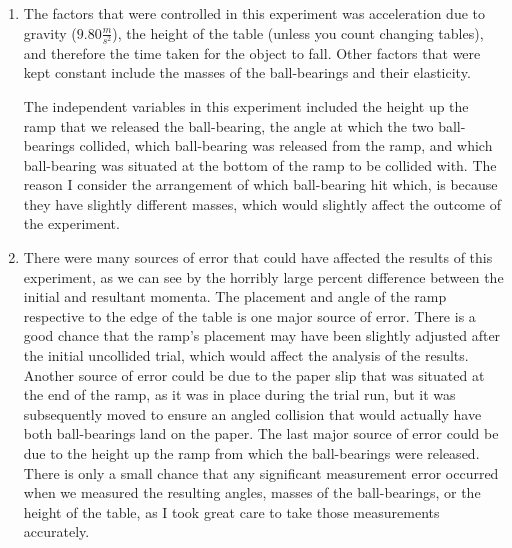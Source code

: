\documentclass[12pt]{article}
\begin{document}
\begin{enumerate}
\item{
The factors that were controlled in this experiment was acceleration due to gravity ($9.80\frac{m}{s^2}$), the height of the table (unless you count changing tables), and therefore the time taken for the object to fall. Other factors that were kept constant include the masses of the ball-bearings and their elasticity.

The independent variables in this experiment included the height up the ramp that we released the ball-bearing, the angle at which the two ball-bearings collided, which ball-bearing was released from the ramp, and which ball-bearing was situated at the bottom of the ramp to be collided with. The reason I consider the arrangement of which ball-bearing hit which, is because they have slightly different masses, which would slightly affect the outcome of the experiment.}

\item{
There were many sources of error that could have affected the results of this experiment, as we can see by the horribly large percent difference between the initial and resultant momenta. The placement and angle of the ramp respective to the edge of the table is one major source of error. There is a good chance that the ramp's placement may have been slightly adjusted after the initial uncollided trial, which would affect the analysis of the results. Another source of error could be due to the paper slip that was situated at the end of the ramp, as it was in place during the trial run, but it was subsequently moved to ensure an angled collision that would actually have both ball-bearings land on the paper. The last major source of error could be due to the height up the ramp from which the ball-bearings were released. There is only a small chance that any significant measurement error occurred when we measured the resulting angles, masses of the ball-bearings, or the height of the table, as I took great care to take those measurements accurately.}

\end{enumerate}
\end{document}
